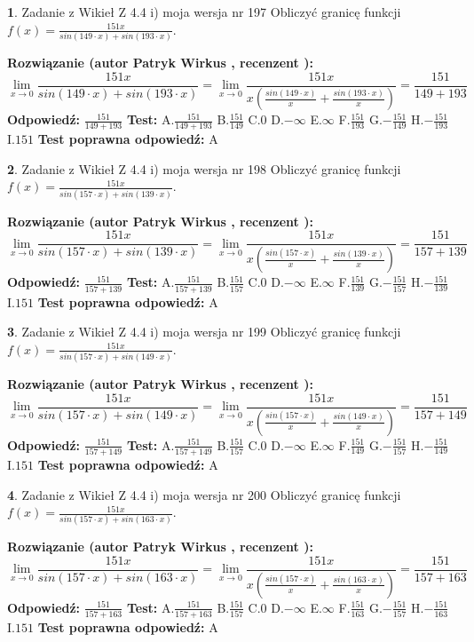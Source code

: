 \documentclass[12pt, a4paper]{article}
\theoremstyle{definition} %
\newtheorem{zad}{}
\newcommand{\zadStart}[1]{\begin{zad}#1\newline}
\newcommand{\zadStop}{\end{zad}}
\newcommand{\rozwStart}[2]{\noindent \textbf{Rozwiązanie (autor #1 , recenzent #2): }\newline}
\newcommand{\rozwStop}{\newline}
\newcommand{\odpStart}{\noindent \textbf{Odpowiedź:}\newline}
\newcommand{\odpStop}{\newline}
\newcommand{\testStart}{\noindent \textbf{Test:}\newline}
\newcommand{\testStop}{\newline}
\newcommand{\kluczStart}{\noindent \textbf{Test poprawna odpowiedź:}\newline}
\newcommand{\kluczStop}{\newline}
\begin{document}
\zadStart{Zadanie z Wikieł Z 4.4 i) moja wersja nr 197}
Obliczyć granicę funkcji $f(x)=\frac{151x}{sin(149\cdot x) +sin(193\cdot x)}$.
\zadStop
\rozwStart{Patryk Wirkus}{}
$$\lim\limits_{x\to 0}\frac{151x}{sin(149\cdot x) +sin(193\cdot x)}=\lim\limits_{x\to 0}\frac{151x}{x(\frac{sin(149\cdot x)}{x}+\frac{sin(193\cdot x)}{x})}=\frac{151}{149+193}$$
\rozwStop
\odpStart
$\frac{151}{149+193}$
\odpStop
\testStart
A.$\frac{151}{149+193}$
B.$\frac{151}{149}$
C.$0$
D.$-\infty$
E.$\infty$
F.$\frac{151}{193}$
G.$-\frac{151}{149}$
H.$-\frac{151}{193}$
I.$151$
\testStop
\kluczStart
A
\kluczStop



\zadStart{Zadanie z Wikieł Z 4.4 i) moja wersja nr 198}
Obliczyć granicę funkcji $f(x)=\frac{151x}{sin(157\cdot x) +sin(139\cdot x)}$.
\zadStop
\rozwStart{Patryk Wirkus}{}
$$\lim\limits_{x\to 0}\frac{151x}{sin(157\cdot x) +sin(139\cdot x)}=\lim\limits_{x\to 0}\frac{151x}{x(\frac{sin(157\cdot x)}{x}+\frac{sin(139\cdot x)}{x})}=\frac{151}{157+139}$$
\rozwStop
\odpStart
$\frac{151}{157+139}$
\odpStop
\testStart
A.$\frac{151}{157+139}$
B.$\frac{151}{157}$
C.$0$
D.$-\infty$
E.$\infty$
F.$\frac{151}{139}$
G.$-\frac{151}{157}$
H.$-\frac{151}{139}$
I.$151$
\testStop
\kluczStart
A
\kluczStop



\zadStart{Zadanie z Wikieł Z 4.4 i) moja wersja nr 199}
Obliczyć granicę funkcji $f(x)=\frac{151x}{sin(157\cdot x) +sin(149\cdot x)}$.
\zadStop
\rozwStart{Patryk Wirkus}{}
$$\lim\limits_{x\to 0}\frac{151x}{sin(157\cdot x) +sin(149\cdot x)}=\lim\limits_{x\to 0}\frac{151x}{x(\frac{sin(157\cdot x)}{x}+\frac{sin(149\cdot x)}{x})}=\frac{151}{157+149}$$
\rozwStop
\odpStart
$\frac{151}{157+149}$
\odpStop
\testStart
A.$\frac{151}{157+149}$
B.$\frac{151}{157}$
C.$0$
D.$-\infty$
E.$\infty$
F.$\frac{151}{149}$
G.$-\frac{151}{157}$
H.$-\frac{151}{149}$
I.$151$
\testStop
\kluczStart
A
\kluczStop



\zadStart{Zadanie z Wikieł Z 4.4 i) moja wersja nr 200}
Obliczyć granicę funkcji $f(x)=\frac{151x}{sin(157\cdot x) +sin(163\cdot x)}$.
\zadStop
\rozwStart{Patryk Wirkus}{}
$$\lim\limits_{x\to 0}\frac{151x}{sin(157\cdot x) +sin(163\cdot x)}=\lim\limits_{x\to 0}\frac{151x}{x(\frac{sin(157\cdot x)}{x}+\frac{sin(163\cdot x)}{x})}=\frac{151}{157+163}$$
\rozwStop
\odpStart
$\frac{151}{157+163}$
\odpStop
\testStart
A.$\frac{151}{157+163}$
B.$\frac{151}{157}$
C.$0$
D.$-\infty$
E.$\infty$
F.$\frac{151}{163}$
G.$-\frac{151}{157}$
H.$-\frac{151}{163}$
I.$151$
\testStop
\kluczStart
A
\kluczStop
\end{document}
